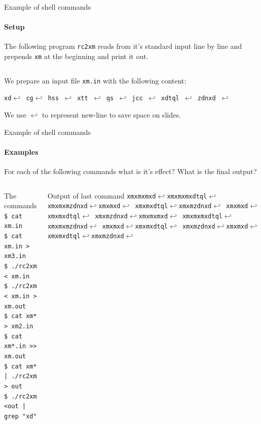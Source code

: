 \begin{frame}[fragile]{Example of shell commands}
\framesubtitle{Setup}
	The following program \texttt{rc2xm} reads from it's standard input line by line and prepends \texttt{xm} at the beginning and print it out. 
	\inputminted{c++}{code/rc2xm/xm.cpp}
	We prepare an input file \texttt{xm.in} with the following content:
	
	\small{\texttt{xd$\hookleftarrow$ cg$\hookleftarrow$ hss $\hookleftarrow$ xtt $\hookleftarrow$ qs $\hookleftarrow$ jcc $\hookleftarrow$ xdtql $\hookleftarrow$ zdnxd $\hookleftarrow$}}
	
	We use $\hookleftarrow$ to represent new-line to save space on slides.
\end{frame}

\begin{frame}{Example of shell commands}
\framesubtitle{Examples}
For each of the following commands what is it's effect? What is the final output?
\vspace{-.2in}
\begin{columns}
	\begin{block}{The commands}
		\texttt{\$ cat xm.in}\\
		\texttt{\$ cat xm.in > xm3.in}\\
		\texttt{\$ ./rc2xm < xm.in}\\
		\texttt{\$ ./rc2xm < xm.in > xm.out}\\
		\texttt{\$ cat xm* > xm2.in}\\
		\texttt{\$ cat xm*.in >> xm.out}\\
		\texttt{\$ cat xm* | ./rc2xm > out}\\
		\texttt{\$ ./rc2xm <out | grep "xd"}
	\end{block}
	\begin{block}{Output of last command}
	\texttt{xmxmxmxd$\hookleftarrow$xmxmxmxdtql$\hookleftarrow$
xmxmxmzdnxd$\hookleftarrow$xmxmxd$\hookleftarrow$
xmxmxdtql$\hookleftarrow$xmxmzdnxd$\hookleftarrow$
xmxmxd$\hookleftarrow$xmxmxdtql$\hookleftarrow$
xmxmzdnxd$\hookleftarrow$xmxmxmxd$\hookleftarrow$
xmxmxmxdtql$\hookleftarrow$xmxmxmzdnxd$\hookleftarrow$
xmxmxd$\hookleftarrow$xmxmxdtql$\hookleftarrow$
xmxmzdnxd$\hookleftarrow$xmxmxd$\hookleftarrow$
xmxmxdtql$\hookleftarrow$xmxmzdnxd$\hookleftarrow$}
	\end{block}
\end{columns}
\end{frame}

